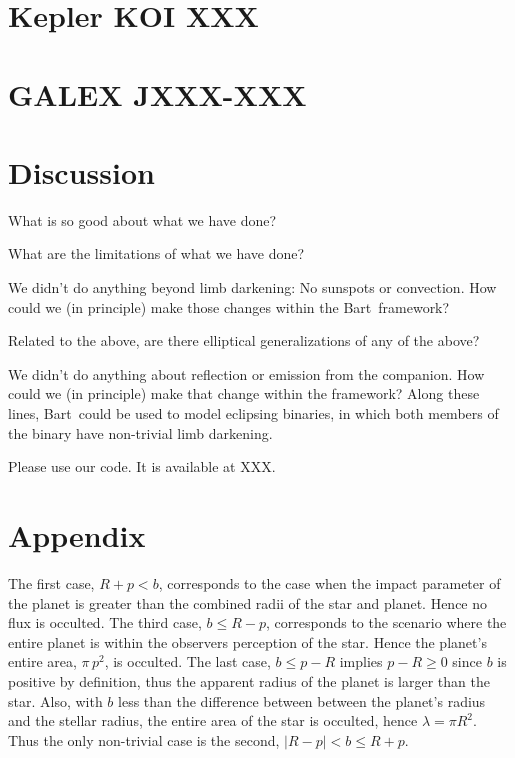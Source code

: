 \documentclass[12pt,preprint]{aastex}
\newcommand{\project}[1]{{\sffamily #1}}
\newcommand{\bart}{\project{Bart}}
\begin{document}
\section{Kepler KOI XXX}

\section{GALEX JXXX-XXX}

\section{Discussion}

What is so good about what we have done?

What are the limitations of what we have done?

We didn't do anything beyond limb darkening:  No sunspots or convection.
How could we (in principle) make those changes within the \bart\ framework?

Related to the above, are there elliptical generalizations of any of the above?

We didn't do anything about reflection or emission from the companion.
How could we (in principle) make that change within the framework?
Along these lines, \bart\ could be used to model eclipsing binaries,
in which both members of the binary have non-trivial limb darkening.

Please use our code.  It is available at XXX.

\acknowledgments

\section{Appendix}

The first case, $R+p < b$, corresponds to the case when the impact parameter
of the planet is greater than the combined radii of the star and planet.
Hence no flux is occulted.
The third case, $b \leq R-p$, corresponds to the scenario where the entire
planet is within the observers perception of the star.
Hence the planet's entire area, $\pi \, p^2$, is occulted.
The last case, $b \leq p-R$ implies $p-R \geq 0$ since $b$ is positive by
definition, thus the apparent radius of the planet is larger than the star.
Also, with $b$ less than the difference between between the planet's radius
and the stellar radius, the entire area of the star is occulted, hence
$\lambda = \pi R^2$.
Thus the only non-trivial case is the second, $|R-p| < b \leq R+p$.
\end{document}
